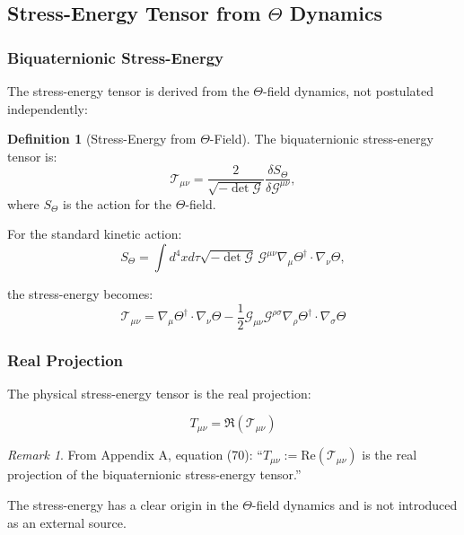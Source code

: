 \documentclass[12pt]{article}
\theoremstyle{definition}
\newtheorem{definition}[theorem]{Definition}
\theoremstyle{remark}
\newtheorem{remark}[theorem]{Remark}
\begin{document}
\subsection{Stress-Energy Tensor from $\Theta$ Dynamics}

\subsubsection{Biquaternionic Stress-Energy}

The stress-energy tensor is derived from the $\Theta$-field dynamics, not postulated independently:

\begin{definition}[Stress-Energy from $\Theta$-Field]
The biquaternionic stress-energy tensor is:
\begin{equation}
\mathcal{T}_{\mu\nu} = \frac{2}{\sqrt{-\det\mathcal{G}}}\frac{\delta S_\Theta}{\delta \mathcal{G}^{\mu\nu}},
\end{equation}
where $S_\Theta$ is the action for the $\Theta$-field.
\end{definition}

For the standard kinetic action:
\begin{equation}
S_\Theta = \int d^4x d\tau \sqrt{-\det\mathcal{G}} \, \mathcal{G}^{\mu\nu}\nabla_\mu \Theta^\dagger \cdot \nabla_\nu \Theta,
\end{equation}

the stress-energy becomes:
\begin{equation}
\mathcal{T}_{\mu\nu} = \nabla_\mu \Theta^\dagger \cdot \nabla_\nu \Theta - \frac{1}{2}\mathcal{G}_{\mu\nu}\mathcal{G}^{\rho\sigma}\nabla_\rho \Theta^\dagger \cdot \nabla_\sigma \Theta
\label{eq:stress_energy_biquat}
\end{equation}

\subsubsection{Real Projection}

The physical stress-energy tensor is the real projection:

\begin{equation}
T_{\mu\nu} = \Re(\mathcal{T}_{\mu\nu})
\label{eq:stress_energy_real}
\end{equation}

\begin{remark}
From Appendix A, equation (70): ``$T_{\mu\nu} := \text{Re}(\mathcal{T}_{\mu\nu})$ is the real projection of the biquaternionic stress-energy tensor.''

The stress-energy has a clear origin in the $\Theta$-field dynamics and is not introduced as an external source.
\end{remark}
\end{document}
